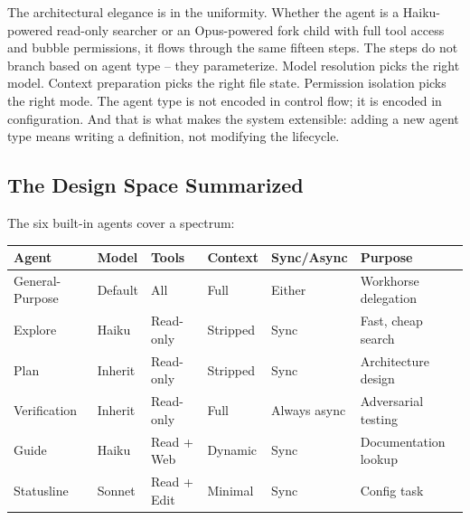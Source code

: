 \documentclass[
  english,
  11pt,
  letterpaper,
]{book}
\begin{document}
The architectural elegance is in the uniformity. Whether the agent is a
Haiku-powered read-only searcher or an Opus-powered fork child with full
tool access and bubble permissions, it flows through the same fifteen
steps. The steps do not branch based on agent type -- they parameterize.
Model resolution picks the right model. Context preparation picks the
right file state. Permission isolation picks the right mode. The agent
type is not encoded in control flow; it is encoded in configuration. And
that is what makes the system extensible: adding a new agent type means
writing a definition, not modifying the lifecycle.

\subsection{The Design Space
Summarized}\label{the-design-space-summarized}

The six built-in agents cover a spectrum:

\begin{longtable}[]{@{}
  >{\raggedright\arraybackslash}p{}
  >{\raggedright\arraybackslash}p{}
  >{\raggedright\arraybackslash}p{}
  >{\raggedright\arraybackslash}p{}
  >{\raggedright\arraybackslash}p{}
  >{\raggedright\arraybackslash}p{}@{}}
\toprule\noalign{}
\begin{minipage}[b]{\linewidth}\raggedright
Agent
\end{minipage} & \begin{minipage}[b]{\linewidth}\raggedright
Model
\end{minipage} & \begin{minipage}[b]{\linewidth}\raggedright
Tools
\end{minipage} & \begin{minipage}[b]{\linewidth}\raggedright
Context
\end{minipage} & \begin{minipage}[b]{\linewidth}\raggedright
Sync/Async
\end{minipage} & \begin{minipage}[b]{\linewidth}\raggedright
Purpose
\end{minipage} \\
\midrule\noalign{}
\endhead
\bottomrule\noalign{}
\endlastfoot
General-Purpose & Default & All & Full & Either & Workhorse
delegation \\
Explore & Haiku & Read-only & Stripped & Sync & Fast, cheap search \\
Plan & Inherit & Read-only & Stripped & Sync & Architecture design \\
Verification & Inherit & Read-only & Full & Always async & Adversarial
testing \\
Guide & Haiku & Read + Web & Dynamic & Sync & Documentation lookup \\
Statusline & Sonnet & Read + Edit & Minimal & Sync & Config task \\
\end{longtable}
\end{document}
